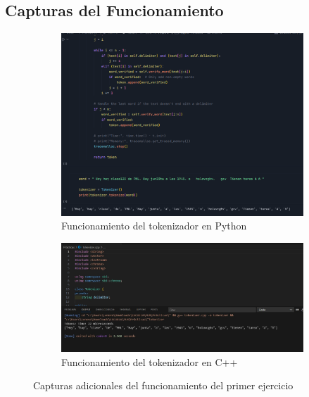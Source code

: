 \documentclass[12pt,a4paper]{article}
\begin{document}
\subsection{Capturas del Funcionamiento}

\begin{figure}[H]
    \centering
    \begin{subfigure}{0.45\textwidth}
        \includegraphics[width=\textwidth]{img/funcionamiento_1.png}
        \caption{Funcionamiento del tokenizador en Python}
    \end{subfigure}
    \hfill
    \begin{subfigure}{0.45\textwidth}
        \includegraphics[width=\textwidth]{img/funcionamiento_1_1.jpeg}
        \caption{Funcionamiento del tokenizador en C++}
    \end{subfigure}
    \caption{Capturas adicionales del funcionamiento del primer ejercicio}
\end{figure}

\newpage
\end{document}
